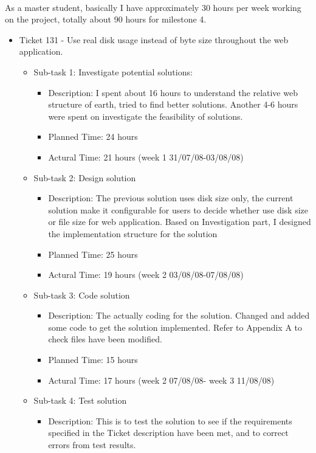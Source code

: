 \documentclass[10pt,a4,oneside]{article}
\begin{document}
\paragraph{}
As a master student, basically I have approximately 30 hours per week working on the project, totally about 90 hours for milestone 4.
\begin{itemize}
 \item Ticket 131 - Use real disk usage instead of byte size throughout the web application.
	\begin{itemize}
	\item Sub-task 1: Investigate potential solutions:
			\begin{itemize}
			\item Description: I spent about 16 hours to understand the relative web structure of earth, tried to find better solutions. Another 4-6 hours were spent on investigate the feasibility of solutions.
			\item Planned Time: 24 hours
			\item Actural Time: 21 hours (week 1 31/07/08-03/08/08)
			\end{itemize}
		\item Sub-task 2: Design solution
			\begin{itemize}
			\item Description: The previous solution uses disk size only, the current solution make it configurable for users to decide whether use disk size or file size for web application. Based on Investigation part, I designed the implementation structure for the solution
			\item Planned Time: 25 hours
			\item Actural Time: 19 hours (week 2 03/08/08-07/08/08)
			\end{itemize}
		\item Sub-task 3: Code solution
			\begin{itemize}
			\item Description: The actually coding for the solution. Changed and added some code to get the solution implemented. Refer to Appendix A to check files have been modified.
			\item Planned Time: 15 hours
			\item Actural Time: 17 hours (week 2 07/08/08- week 3 11/08/08)
			\end{itemize}
 		\item Sub-task 4: Test solution
			\begin{itemize}
			\item Description: This is to test the solution to see if the requirements specified in the Ticket description have been met, and to correct errors from test results.

\end{itemize}
\end{itemize}
\end{itemize}
\end{document}
